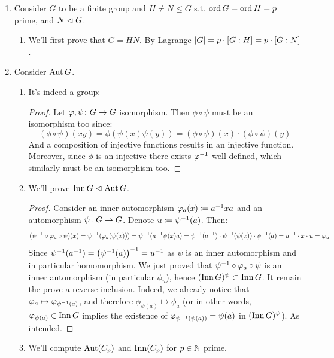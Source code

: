 \documentclass[a4paper]{article}
\begin{document}
\begin{enumerate}
\begin{enumerate}
\begin{proof}
				Consider the map $\phi \co (\Z \times \Z) \to (\Z \times (\Z /n\Z))$ defined by: 
				\[ \phi(x, y) \cod (x, y \bmod n) \]
				It's clearly an homomorphism, onto (it's the identity under the trivial embedding of $\Z \times \Z/n\Z$ into $\Z \times \Z$), and well-defined ($y \bmod n \in \Z/n\Z$). Moreover: 
				\[ \ker \phi = \ccb{(x, y \bmod n) = (0, 0) \mid (x, y) \in \Z^{2}} = \ccb{(0, nk) \mid k \in \Z} = \la (0, n) \ra \cong \la(n, n)\ra \]
				So by the first isomorphism theorem, we finished the proof. 
			\end{proof}
		\end{enumerate}
		\item Consider $G $ to be a finite group and $H \neq N \le G$ s.t. $\operatorname{ord} G = \operatorname{ord} H = p$ prime, and $N \vartriangleleft G$. 
		\begin{enumerate}
			\item We'll first prove that $G = HN$. By Lagrange $\left \lvert G \right \rvert = p \cdot \left [ G : H \right ] = p \cdot \left [ G : N \right ]$. 
		\end{enumerate}
		\item Consider $\operatorname{Aut} G$. 
		\begin{enumerate}
			\item It's indeed a group: 
			\begin{proof}
				Let $\varphi, \psi \colon G \to G$ isomorphism. Then $\phi \circ \psi$ must be an isomorphism too since: 
				\[ (\phi \circ \psi)(xy) = \phi(\psi(x)\psi(y)) = (\phi \circ \psi)(x) \cdot (\phi \circ \psi)(y) \]
				And a composition of injective functions results in an injective function. 
				Moreover, since $\phi$ is an injective there exists $\varphi^{-1}$ well defined, which similarly must be an isomorphism too. 
			\end{proof}
			\item We'll prove $\operatorname{Inn} G \vartriangleleft \operatorname{Aut} G$. \begin{proof}
				Consider an inner automorphism $\varphi_a(x) \coloneqq a^{-1} xa$ and an automorphism $\psi \colon G \to G$. Denote $u \coloneqq \psi^{-1}(a)$. Then: 
				\[ (\psi^{-1} \circ \varphi_a \circ \psi)(x) = \psi^{-1}(\varphi_a(\psi(x))) = \psi^{-1}(a^{-1} \psi(x) a) = \psi^{-1}(a^{-1}) \cdot \psi^{-1}(\psi(x)) \cdot \psi^{-1}(a) = u^{-1} \cdot x \cdot u = \varphi_{u} \]
				Since $\psi^{-1}(a^{-1}) = \left ( \psi^{-1}(a) \right )^{-1} = u^{-1}$ as $\psi$ is an inner automorphism and in particular homomorphism. We just proved that $\psi^{-1} \circ \varphi_a\circ \psi$ is an inner automorphism (in particular $\phi_u$), hence $(\operatorname{Inn} G)^{\psi} \subset \operatorname{Inn} G$. It remain the prove a reverse inclusion. Indeed, we already notice that $\varphi_a \mapsto \varphi_{\psi^{-1}(a)}$, and therefore $\phi_{\psi(a)} \mapsto \phi_a$ (or in other words, $\varphi_{\psi(a)} \in \operatorname{Inn} G$ implies the existence of $\varphi_{\psi^{-1}(\psi(a))} = \psi(a)$ in $(\operatorname{Inn} G)^{\psi}$). As intended. 
			\end{proof}
			\item We'll compute $\operatorname{Aut}(C_p)$ and $\operatorname{Inn}(C_p)$ for $p \in \mathbb{N}$ prime. 
			

\end{enumerate}
\end{enumerate}
\end{document}
